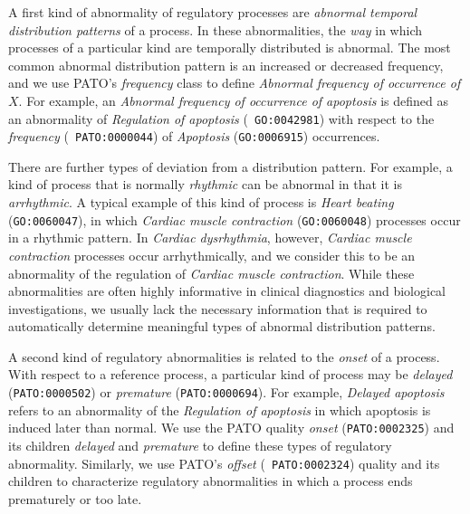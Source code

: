 \documentclass[11pt]{article}
\begin{document}
A first kind of abnormality of regulatory processes are {\em abnormal
  temporal distribution patterns} of a process. In these
abnormalities, the {\em way} in which processes of a particular kind
are temporally distributed is abnormal.  The most common abnormal
distribution pattern is an increased or decreased frequency, and we
use PATO's {\em frequency} class to define {\em Abnormal frequency of
  occurrence of $X$}.
For example, an {\em Abnormal frequency of occurrence of apoptosis} is
defined as an abnormality of {\em Regulation of apoptosis} ({\tt
  GO:0042981}) with respect to the {\em frequency} ({\tt
  PATO:0000044}) of {\em Apoptosis} ({\tt GO:0006915}) occurrences.

There are further types of deviation from a distribution pattern. For
example, a kind of process that is normally {\em rhythmic} can be
abnormal in that it is {\em arrhythmic}. A typical example of this
kind of process is {\em Heart beating} ({\tt GO:0060047}), in which
{\em Cardiac muscle contraction} ({\tt GO:0060048}) processes occur in
a rhythmic pattern. In {\em Cardiac dysrhythmia}, however, {\em
  Cardiac muscle contraction} processes occur arrhythmically, and we
consider this to be an abnormality of the regulation of {\em Cardiac
  muscle contraction}. While these abnormalities are often highly
informative in clinical diagnostics and biological investigations, we
usually lack the necessary information that is required to
automatically determine meaningful types of abnormal distribution
patterns.

A second kind of regulatory abnormalities is related to the {\em
  onset} of a process. With respect to a reference process, a
particular kind of process may be {\em delayed} ({\tt PATO:0000502})
or {\em premature} ({\tt PATO:0000694}). For example, {\em Delayed
  apoptosis} refers to an abnormality of the {\em Regulation of
  apoptosis} in which apoptosis is induced later than normal.  We use
the PATO quality {\em onset} ({\tt PATO:0002325}) and its children
{\em delayed} and {\em premature} to define these types of regulatory
abnormality. Similarly, we use PATO's {\em offset} ({\tt
  PATO:0002324}) quality and its children to characterize regulatory
abnormalities in which a process ends prematurely or too late.
\end{document}
